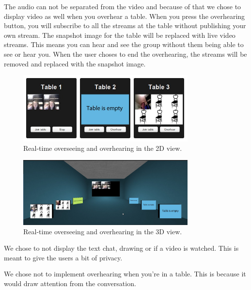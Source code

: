 \documentclass[12pt, titlepage]{article}
\begin{document}
The audio can not be separated from the video and because of that we chose to display video as well when you overhear a table. When you press the overhearing button, you will subscribe to all the streams at the table without publishing your own stream. The snapshot image for the table will be replaced with live video streams. This means you can hear and see the group without them being able to see or hear you. When the user choses to end the overhearing, the streams will be removed and replaced with the snapshot image.
\begin{figure}[H]
  \centering
	\includegraphics[width=0.8\textwidth,keepaspectratio]{overhear2d.jpg}
  \caption{Real-time overseeing and overhearing in the 2D view.}
\end{figure}
\begin{figure}[H]
  \centering
	\includegraphics[width=0.8\textwidth,keepaspectratio]{3doverhearing.jpg}
  \caption{Real-time overseeing and overhearing in the 3D view.}
\end{figure}
We chose to not display the text chat, drawing or if a video is watched. This is meant to give the users a bit of privacy. 

We chose not to implement overhearing when you're in a table. This is because it would draw attention from the conversation.
\end{document}
